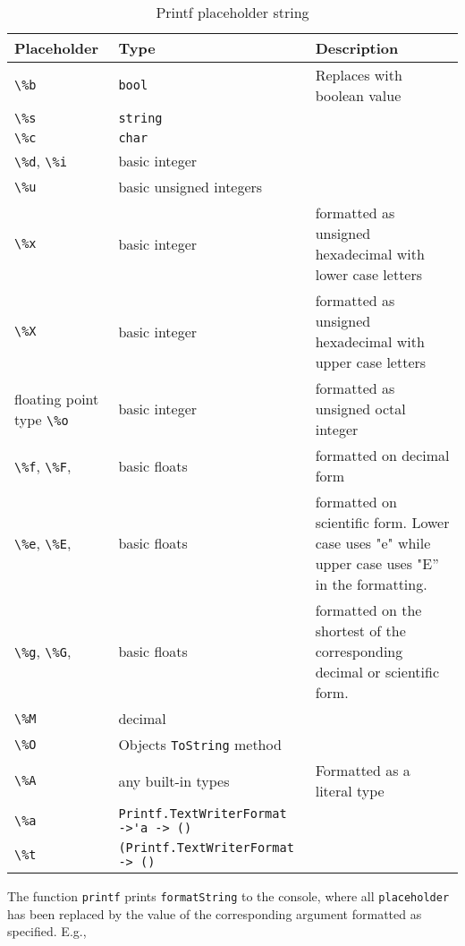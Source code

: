 \begin{table}
  \centering
  \begin{tabularx}{\linewidth}{|l|l|X|}
    \hline
    \rowcolor{headerRowColor} Placeholder& Type&Description\\
    \hline
    \lstinline!\%b!&\lstinline!bool!&Replaces with boolean value\\
    \hline
    \lstinline!\%s!&\lstinline!string!&\\
    \hline
    \lstinline!\%c!&\lstinline!char!&\\
    \hline
    \mbox{\lstinline!\%d!,} \mbox{\lstinline!\%i!}&basic integer&\\
    \hline
    \lstinline!\%u!&basic unsigned integers&\\
    \hline
    \lstinline!\%x!&basic integer&formatted as unsigned hexadecimal with lower case letters\\
    \hline
    \lstinline!\%X!&basic integer&formatted as unsigned hexadecimal with upper case letters\\
    \hline floating point type
    \lstinline!\%o!&basic integer&formatted as unsigned octal integer\\
    \hline
    \mbox{\lstinline!\%f!,} \mbox{\lstinline!\%F!,} &basic floats&formatted on decimal form\\
    \hline
    \mbox{\lstinline!\%e!,} \mbox{\lstinline!\%E!,} &basic floats&formatted on scientific form. Lower case uses "e" while upper case uses "E'' in the formatting.\\
    \hline
    \mbox{\lstinline!\%g!,} \mbox{\lstinline!\%G!,} &basic floats&formatted on the shortest of the corresponding decimal or scientific form.\\
    \hline
    \lstinline!\%M!&decimal&\\
    \hline
    \lstinline!\%O!&Objects \lstinline!ToString! method&\\
    \hline
    \lstinline!\%A!&any built-in types&Formatted as a literal type\\
    \hline
    \lstinline!\%a!&\lstinline[language=ebnf]!Printf.TextWriterFormat ->'a -> ()!&\\
    \hline
    \lstinline!\%t!&\lstinline[language=ebnf]!(Printf.TextWriterFormat -> ()!&\\
    \hline
  \end{tabularx}
  \caption{Printf placeholder string}
  \label{tab:printfPlaceholder}
\end{table}
The function \lstinline[language=ebnf]!printf! prints \lstinline[language=ebnf]!formatString! to the console, where all \lstinline[language=ebnf]!placeholder! has been replaced by the value of the corresponding argument formatted as specified. E.g.,
